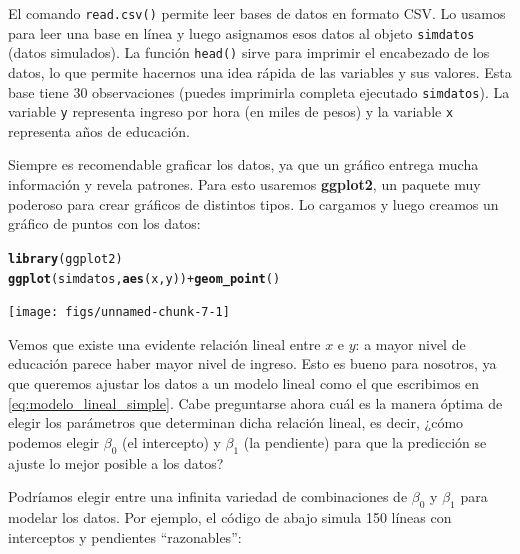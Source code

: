 \documentclass{report}\usepackage[]{graphicx}\usepackage[]{color}
\makeatletter
\newcommand{\hlopt}[1]{\textcolor[rgb]{0,0,0}{#1}}%
\newcommand{\hlstd}[1]{\textcolor[rgb]{0.345,0.345,0.345}{#1}}%
\newcommand{\hlkwd}[1]{\textcolor[rgb]{0.737,0.353,0.396}{\textbf{#1}}}%
\newenvironment{kframe}{%
 \def\at@end@of@kframe{}%
 \ifinner\ifhmode%
  \def\at@end@of@kframe{\end{minipage}}%
  \begin{minipage}{\columnwidth}%
 \fi\fi%
 \def\FrameCommand##1{\hskip\@totalleftmargin \hskip-\fboxsep
 \colorbox{shadecolor}{##1}\hskip-\fboxsep
     \hskip-\linewidth \hskip-\@totalleftmargin \hskip\columnwidth}%
 \MakeFramed {\advance\hsize-\width
   \@totalleftmargin\z@ \linewidth\hsize
   \@setminipage}}%
 {\par\unskip\endMakeFramed%
 \at@end@of@kframe}
\newenvironment{knitrout}{}{} %
\newcommand*{\paq}[1]{\textbf{#1}\index{#1@\textbf{#1}}}
\makeatother
\begin{document}
El comando \verb|read.csv()| permite leer bases de datos en formato CSV. Lo usamos para leer una base en línea y luego asignamos esos datos al objeto \verb|simdatos| (datos simulados). 
La función \verb|head()| sirve para imprimir el encabezado de los datos, lo que permite hacernos una idea rápida de las variables y sus valores.
Esta base tiene 30 observaciones (puedes imprimirla completa ejecutado \verb|simdatos|). La variable \verb|y| representa ingreso por hora (en miles de pesos) y la variable \verb|x| representa años de educación.

Siempre es recomendable graficar los datos, ya que un gráfico entrega mucha información y revela patrones. Para esto usaremos \paq{ggplot2}, un paquete muy poderoso para crear gráficos de distintos tipos. Lo cargamos y luego creamos un gráfico de puntos con los datos:

\begin{knitrout}
\color{fgcolor}\begin{kframe}
\begin{alltt}
\hlkwd{library}\hlstd{(ggplot2)}
\hlkwd{ggplot}\hlstd{(simdatos,} \hlkwd{aes}\hlstd{(x, y))} \hlopt{+} \hlkwd{geom_point}\hlstd{()}
\end{alltt}
\end{kframe}

{\centering \texttt{[image: figs/unnamed-chunk-7-1]} 

}



\end{knitrout}

Vemos que existe una evidente relación lineal entre $x$ e $y$: a mayor nivel de educación parece haber mayor nivel de ingreso.
Esto es bueno para nosotros, ya que queremos ajustar los datos a un modelo lineal como el que escribimos en \eqref{eq:modelo_lineal_simple}.
Cabe preguntarse ahora cuál es la manera óptima de elegir los parámetros que determinan dicha relación lineal, es decir, ¿cómo podemos elegir $\beta_0$ (el intercepto) y $\beta_1$ (la pendiente) para que la predicción se ajuste lo mejor posible a los datos?

Podríamos elegir entre una infinita variedad de combinaciones de $\beta_0$ y $\beta_1$ para modelar los datos. Por ejemplo, el código de abajo simula 150 líneas con interceptos y pendientes ``razonables'':
\end{document}
